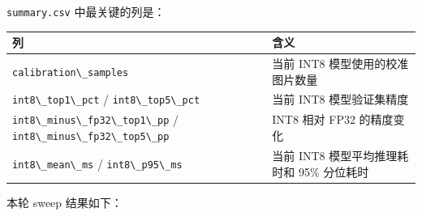 \passthrough{\lstinline!summary.csv!} 中最关键的列是：

\begin{longtable}[]{@{}
  >{\raggedright\arraybackslash}p{}
  >{\raggedright\arraybackslash}p{}@{}}
\toprule\noalign{}
\begin{minipage}[b]{\linewidth}\raggedright
列
\end{minipage} & \begin{minipage}[b]{\linewidth}\raggedright
含义
\end{minipage} \\
\midrule\noalign{}
\endhead
\bottomrule\noalign{}
\endlastfoot
\passthrough{\lstinline!calibration\_samples!} & 当前 INT8
模型使用的校准图片数量 \\
\passthrough{\lstinline!int8\_top1\_pct!} /
\passthrough{\lstinline!int8\_top5\_pct!} & 当前 INT8 模型验证集精度 \\
\passthrough{\lstinline!int8\_minus\_fp32\_top1\_pp!} /
\passthrough{\lstinline!int8\_minus\_fp32\_top5\_pp!} & INT8 相对 FP32
的精度变化 \\
\passthrough{\lstinline!int8\_mean\_ms!} /
\passthrough{\lstinline!int8\_p95\_ms!} & 当前 INT8 模型平均推理耗时和
95\% 分位耗时 \\
\end{longtable}

本轮 sweep 结果如下：


